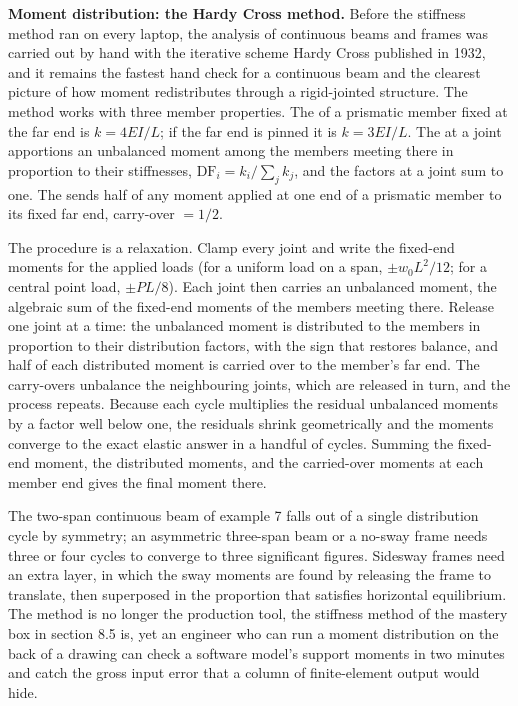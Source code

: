 \begin{mastery}
\textbf{Moment distribution: the Hardy Cross method.} Before the
stiffness method ran on every laptop, the analysis of continuous beams
and frames was carried out by hand with the iterative scheme Hardy Cross
published in 1932, and it remains the fastest hand check for a
continuous beam and the clearest picture of how moment redistributes
through a rigid-jointed structure. The method works with three member
properties. The  of a prismatic member fixed at the
far end is $k = 4EI/L$; if the far end is pinned it is $k = 3EI/L$. The
 at a joint apportions an unbalanced moment
among the members meeting there in proportion to their stiffnesses,
$\text{DF}_i = k_i / \sum_j k_j$, and the factors at a joint sum to one.
The  sends half of any moment applied at one
end of a prismatic member to its fixed far end, carry-over $= 1/2$.

The procedure is a relaxation. Clamp every joint and write the
fixed-end moments for the applied loads (for a uniform load on a span,
$\pm w_0 L^2/12$; for a central point load, $\pm PL/8$). Each joint
then carries an unbalanced moment, the algebraic sum of the fixed-end
moments of the members meeting there. Release one joint at a time: the
unbalanced moment is distributed to the members in proportion to their
distribution factors, with the sign that restores balance, and half of
each distributed moment is carried over to the member's far end. The
carry-overs unbalance the neighbouring joints, which are released in
turn, and the process repeats. Because each cycle multiplies the
residual unbalanced moments by a factor well below one, the residuals
shrink geometrically and the moments converge to the exact
elastic answer in a handful of cycles. Summing the fixed-end moment, the
distributed moments, and the carried-over moments at each member end
gives the final moment there.

The two-span continuous beam of example 7 falls out of a single
distribution cycle by symmetry; an asymmetric three-span beam or a
no-sway frame needs three or four cycles to converge to three
significant figures. Sidesway frames need an extra layer, in which the
sway moments are found by releasing the frame to translate, then
superposed in the proportion that satisfies horizontal equilibrium. The
method is no longer the production tool, the stiffness method of the
mastery box in section 8.5 is, yet an engineer who can run a moment
distribution on the back of a drawing can check a software model's
support moments in two minutes and catch the gross input error that a
column of finite-element output would hide.
\end{mastery}

